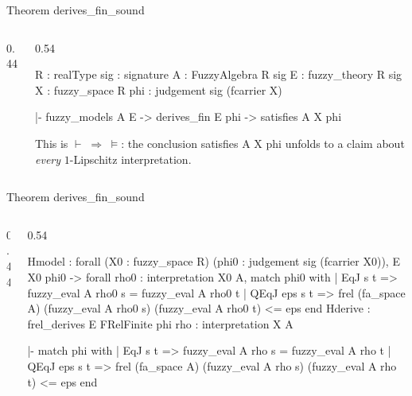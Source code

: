 \documentclass[10pt,aspectratio=169]{beamer}
\newcommand{\rid}[1]{{\ttfamily\small #1}}
\begin{document}
\begin{frame}[fragile]{Theorem \rid{derives\_fin\_sound}}
  \begin{columns}[T]
  \begin{column}{0.44\textwidth}\end{column}
  \begin{column}{0.54\textwidth}
    \begin{goalbox}[title={Proof state}]
\begin{gctx}
R : realType
sig : signature
A : FuzzyAlgebra R sig
E : fuzzy_theory R sig
X : fuzzy_space R
phi : judgement sig (fcarrier X)
\end{gctx}
\tcblower
\begin{gconc}
|- fuzzy_models A E ->
   derives_fin E phi ->
   satisfies A X phi
\end{gconc}
    \end{goalbox}
    \smallskip
    {\footnotesize This is $\vdash\;\Rightarrow\;\models$: the
    conclusion \rid{satisfies A X phi} unfolds to a claim about
    \emph{every} $1$-Lipschitz interpretation.}
  \end{column}
  \end{columns}
\end{frame}

\begin{frame}[fragile]{Theorem \rid{derives\_fin\_sound}}
  \begin{columns}[T]
  \begin{column}{0.44\textwidth}\end{column}
  \begin{column}{0.54\textwidth}
    \begin{goalbox}[title={Proof state}]
\begin{gctx}
Hmodel : forall (X0 : fuzzy_space R)
           (phi0 : judgement sig (fcarrier X0)),
         E X0 phi0 ->
         forall rho0 : interpretation X0 A,
         match phi0 with
         | EqJ s t => fuzzy_eval A rho0 s = fuzzy_eval A rho0 t
         | QEqJ eps s t =>
             frel (fa_space A) (fuzzy_eval A rho0 s)
                               (fuzzy_eval A rho0 t) <= eps
         end
Hderive : frel_derives E FRelFinite phi
rho : interpretation X A
\end{gctx}
\tcblower
\begin{gconc}
|- match phi with
   | EqJ s t => fuzzy_eval A rho s = fuzzy_eval A rho t
   | QEqJ eps s t =>
       frel (fa_space A) (fuzzy_eval A rho s)
                         (fuzzy_eval A rho t) <= eps
   end
\end{gconc}
    \end{goalbox}
  \end{column}
  \end{columns}
\end{frame}
\end{document}
